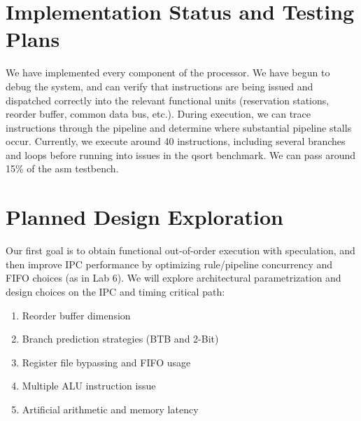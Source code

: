 \documentclass[12pt]{article}
\begin{document}
    \section{Implementation Status and Testing Plans}

    We have implemented every component of the processor. We have begun to debug
the system, and can verify that instructions are being issued and dispatched
correctly into the relevant functional units (reservation stations, reorder
buffer, common data bus, etc.). During execution, we can trace instructions
through the pipeline and determine where substantial pipeline stalls occur.
Currently, we execute around 40 instructions, including several branches and
loops before running into issues in the qsort benchmark. We can pass around
15\% of the asm testbench.

    \section{Planned Design Exploration}
    
    Our first goal is to obtain functional out-of-order execution with
    speculation, and then improve IPC performance by optimizing rule/pipeline
    concurrency and FIFO choices (as in Lab 6). We will explore architectural
    parametrization and design choices on the IPC and timing critical path:  
    
    \begin{enumerate}
        \item Reorder buffer dimension
        \item Branch prediction strategies (BTB and 2-Bit)
        \item Register file bypassing and FIFO usage
        \item Multiple ALU instruction issue
        \item Artificial arithmetic and memory latency
    \end{enumerate}
    
    
    
    

 
\end{document}
